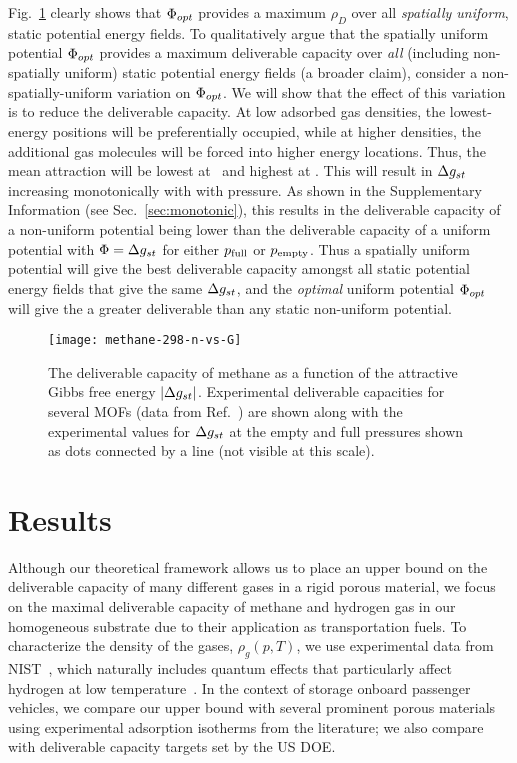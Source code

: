 Fig.~\ref{fig:methane-298-D} clearly shows that $\Phi_{opt}$ provides a maximum $\rho_D$ over all \emph{spatially uniform}, static potential energy fields. To qualitatively argue that the spatially uniform potential $\Phi_{opt}$ provides a maximum deliverable capacity over \emph{all} (including non-spatially uniform) static potential energy fields (a broader claim), consider a non-spatially-uniform variation on $\Phi_{opt}$.
We will show that the effect of this variation is to reduce the deliverable capacity.
At low adsorbed gas densities, the lowest-energy positions will be preferentially occupied, while at higher densities, the additional gas molecules will be forced into higher energy locations. Thus, the mean attraction will be lowest at \pfull\  and highest at \pempty.  This will result in $\Delta g_{st}$ increasing monotonically with with pressure.  As shown in the Supplementary Information (see Sec.~\ref{sec:monotonic}), this results in the deliverable capacity of a non-uniform potential being lower than the deliverable capacity of a uniform potential with $\Phi=\Delta g_{st}$ for either $p_{\text{full}}$ or $p_{\text{empty}}$.
Thus a spatially uniform potential will give the best deliverable capacity amongst all static potential energy fields that give the same $\Delta g_{st}$, and the \emph{optimal} uniform potential $\Phi_{opt}$ will give the a greater deliverable than any static non-uniform potential.

\begin{figure}
    \centering
    \texttt{[image: methane-298-n-vs-G]}
    \caption{The deliverable capacity of methane as a function of the attractive Gibbs free energy $|\Delta g_{st}|$.
    Experimental deliverable capacities for several MOFs (data from Ref.~\cite{mason2014evaluating, furukawa2009storage}) are shown along with the experimental values for $\Delta g_{st}$ at the empty and full pressures shown as dots connected by a line (not visible at this scale).}
    \label{fig:methane-298-D}
\end{figure}

\section{Results}
Although our theoretical framework allows us to place an upper bound on the deliverable capacity of many different gases in a rigid porous material, we focus on the maximal deliverable capacity of methane and hydrogen gas in our homogeneous substrate due to their application as transportation fuels. To characterize the density of the gases, $\rho_g(p, T)$, we use experimental data from NIST~\cite{nist}, which naturally includes quantum effects that particularly affect hydrogen at low temperature~\cite{kumar2006quantum}. In the context of storage onboard passenger vehicles, we compare our upper bound with several prominent porous materials using experimental adsorption isotherms from the literature; we also compare with deliverable capacity targets set by the US DOE.

